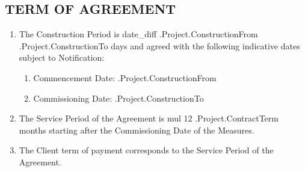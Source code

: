 \subsection{TERM OF AGREEMENT}
\begin{enumerate}
	\item	The Construction Period is {{date_diff .Project.ConstructionFrom .Project.ConstructionTo}} days and agreed with the following indicative dates subject to Notification:
	\begin{enumerate}
		\item	Commencement Date:    \iffalse input project.construction_from value="{{.Project.ConstructionFrom}}" type="date" \fi {{.Project.ConstructionFrom}}
		\item	Commissioning Date:   \iffalse input project.construction_to value="{{.Project.ConstructionTo}}" type="date" \fi {{.Project.ConstructionTo}}
	\end{enumerate}
\item	The Service Period of the Agreement is {{mul 12 .Project.ContractTerm}} months starting after the Commissioning Date of the Measures.
	\item	The Client term of payment corresponds to the Service Period of the Agreement.
\end{enumerate}

